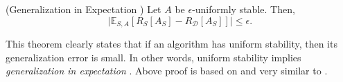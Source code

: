 \begin{theorem}{\rm (Generalization in Expectation \citep[Theorem 2.2]{hardt2016train})}
Let $A$ be $\epsilon$-uniformly stable. Then,
    \begin{equation}\label{E-gen}
     \vert\mathbb{E}_{S,A}\left[R_{S}\left[A_S\right]-R_\mathcal{D}\left[A_S\right]\right]\vert \leq \epsilon.
    \end{equation}
\end{theorem}

This theorem clearly states that if an algorithm has uniform stability, then its generalization error is small. In other words, uniform stability implies \emph{generalization in expectation} \cite{hardt2016train}. Above proof is based on \citet[Lemma 7]{bousquet2002stability} and very similar to \citet[Lemma 11]{shalev2010learnability}.

